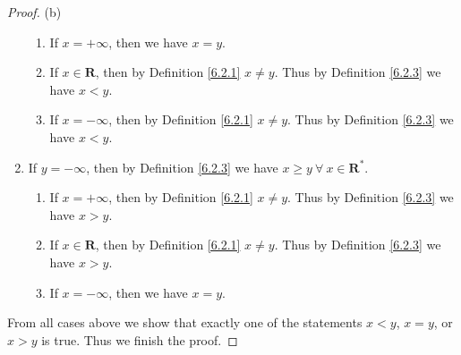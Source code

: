 \begin{proof}{(b)}
\begin{enumerate}[label=(\Roman*)]
    \begin{enumerate}[label=(\roman*)]
        \item If \(x = +\infty\), then we have \(x = y\).
        \item If \(x \in \mathbf{R}\), then by Definition \ref{6.2.1} \(x \neq y\).
        Thus by Definition \ref{6.2.3} we have \(x < y\).
        \item If \(x = -\infty\), then by Definition \ref{6.2.1} \(x \neq y\).
        Thus by Definition \ref{6.2.3} we have \(x < y\).
    \end{enumerate}
    \item If \(y = -\infty\), then by Definition \ref{6.2.3} we have \(x \geq y \ \forall\ x \in \mathbf{R}^*\).
    \begin{enumerate}[label=(\roman*)]
        \item If \(x = +\infty\), then by Definition \ref{6.2.1} \(x \neq y\).
        Thus by Definition \ref{6.2.3} we have \(x > y\).
        \item If \(x \in \mathbf{R}\), then by Definition \ref{6.2.1} \(x \neq y\).
        Thus by Definition \ref{6.2.3} we have \(x > y\).
        \item If \(x = -\infty\), then we have \(x = y\).
    \end{enumerate}
\end{enumerate}
From all cases above we show that exactly one of the statements \(x < y\), \(x = y\), or \(x > y\) is true.
Thus we finish the proof.
\end{proof}

